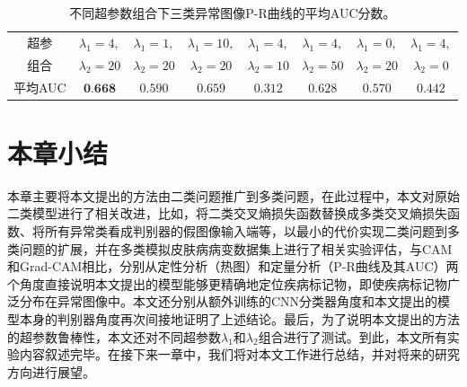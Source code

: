 \begin{table}[H]
	\centering
	\caption[不同超参数组合下三类异常图像P-R曲线的平均AUC分数]{不同超参数组合下三类异常图像P-R曲线的平均AUC分数。}
	\label{tab:simulated_skin_diff_parameters}
		\begin{tabular}{c|c|c|c|c|c|c|c}
			\toprule[2pt]
			
			超参& $\lambda_{1}=4,$ & $\lambda_{1}=1,$& $\lambda_{1}=10,$&
			$\lambda_{1}=4,$ & $\lambda_{1}=4,$ &
			$\lambda_{1}=0,$ &
			$\lambda_{1}=4,$\\
			组合		  & 
			$\lambda_{2}=20$ & $\lambda_{2}=20$ &
			$\lambda_{2}=20$ & $\lambda_{2}=10$ & $\lambda_{2}=50$ &
			$\lambda_{2}=20$&
			$\lambda_{2}=0$ \\
			\midrule[2pt]



			平均AUC	& $\textbf{0.668}$ &	$0.590 $ & $0.659$ & $0.312$ & $0.628$& $0.570$ &	$0.442$ \\
			\bottomrule[2pt]
		\end{tabular}
\end{table}
\section{本章小结}
本章主要将本文提出的方法由二类问题推广到多类问题，在此过程中，本文对原始二类模型进行了相关改进，比如，将二类交叉熵损失函数替换成多类交叉熵损失函数、将所有异常类看成判别器的假图像输入端等，以最小的代价实现二类问题到多类问题的扩展，并在多类模拟皮肤病病变数据集上进行了相关实验评估，与CAM和Grad-CAM相比，分别从定性分析（热图）和定量分析（P-R曲线及其AUC）两个角度直接说明本文提出的模型能够更精确地定位疾病标记物，即使疾病标记物广泛分布在异常图像中。本文还分别从额外训练的CNN分类器角度和本文提出的模型本身的判别器角度再次间接地证明了上述结论。最后，为了说明本文提出的方法的超参数鲁棒性，本文还对不同超参数$\lambda_{1}$和$\lambda_{2}$组合进行了测试。到此，本文所有实验内容叙述完毕。在接下来一章中，我们将对本文工作进行总结，并对将来的研究方向进行展望。

